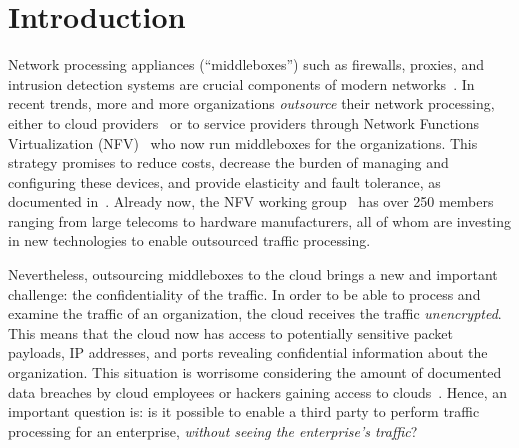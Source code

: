 

\section{Introduction}\label{sec:intro}


    Network processing appliances (``middleboxes'') such as firewalls, proxies, and intrusion detection systems are crucial components of modern networks~\cite{aplomb}. 
     In recent trends, more and more organizations {\it outsource} their network processing, either to cloud providers~\cite{aplomb, aryaka, zscalar} or to service providers through Network Functions Virtualization (NFV)~\cite{nfv} who now run  middleboxes for the organizations. This strategy promises to reduce costs, decrease the burden of managing and configuring these devices, and provide elasticity and fault tolerance, as documented in~\cite{aplomb}.
Already now, the NFV working group~\cite{nfvwg} has over 250 members ranging from large telecoms to hardware manufacturers, all of whom are investing in new technologies to enable outsourced traffic processing.
   
   Nevertheless, outsourcing middleboxes to the cloud brings a new and important challenge: the confidentiality of the traffic. In order to be able to process and examine the traffic of an organization, the cloud  receives  the traffic {\em unencrypted}.  This means that the cloud now has access to potentially sensitive packet payloads,  IP addresses, and ports revealing confidential information about the organization. This situation is worrisome considering the amount of documented data breaches by cloud employees or hackers gaining access to clouds~\cite{XXX}.
   Hence, an important question is: is it possible to enable a third party to perform traffic processing for an enterprise, {\em without seeing the enterprise's traffic}?
   
   
   

